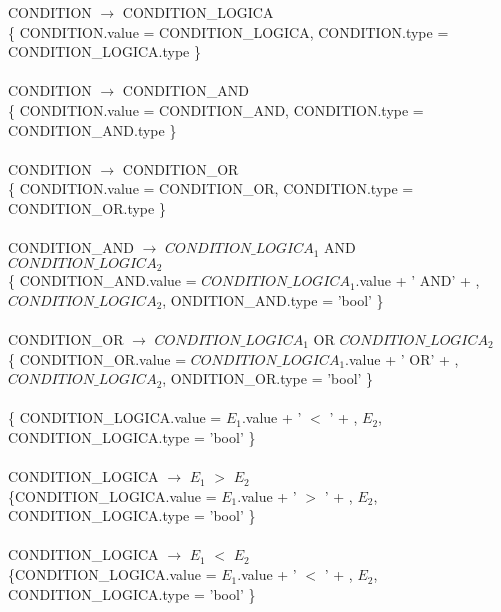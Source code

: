 \documentclass[10pt,a4paper]{article}
\begin{document}
{{{CONDITION $\rightarrow$ CONDITION\_LOGICA   \\
\{ CONDITION.value = CONDITION\_LOGICA,  CONDITION.type = CONDITION\_LOGICA.type \}  \\ \\


CONDITION $\rightarrow$ CONDITION\_AND   \\

\{ CONDITION.value = CONDITION\_AND,  CONDITION.type = CONDITION\_AND.type \}  \\ \\

CONDITION $\rightarrow$ CONDITION\_OR \\

\{ CONDITION.value = CONDITION\_OR,  CONDITION.type = CONDITION\_OR.type \}  \\ \\


CONDITION\_AND $\rightarrow$ $CONDITION\_LOGICA_{1}$ AND $CONDITION\_LOGICA_{2}$ \\

\{ CONDITION\_AND.value = $CONDITION\_LOGICA_{1}$.value + ' AND' +  , $CONDITION\_LOGICA_{2}$,  ONDITION\_AND.type = 'bool' \}  \\ \\


CONDITION\_OR $\rightarrow$ $CONDITION\_LOGICA_{1}$ OR $CONDITION\_LOGICA_{2}$ \\


\{ CONDITION\_OR.value = $CONDITION\_LOGICA_{1}$.value + ' OR' +  , $CONDITION\_LOGICA_{2}$,  ONDITION\_OR.type = 'bool' \}  \\ \\


\{ CONDITION\_LOGICA.value = $E_{1}$.value + ' $<$ ' +  , $E_{2}$,  CONDITION\_LOGICA.type = 'bool' \}  \\ \\


CONDITION\_LOGICA $\rightarrow$ $E_{1}$ $>$ $E_{2}$   \\

\{CONDITION\_LOGICA.value = $E_{1}$.value + ' $>$ ' +  , $E_{2}$,  CONDITION\_LOGICA.type = 'bool' \}  \\ \\

CONDITION\_LOGICA $\rightarrow$ $E_{1}$ $<$ $E_{2}$   \\

\{CONDITION\_LOGICA.value = $E_{1}$.value + ' $<$ ' +  , $E_{2}$,  CONDITION\_LOGICA.type = 'bool' \}  \\ \\


}}}
\end{document}

